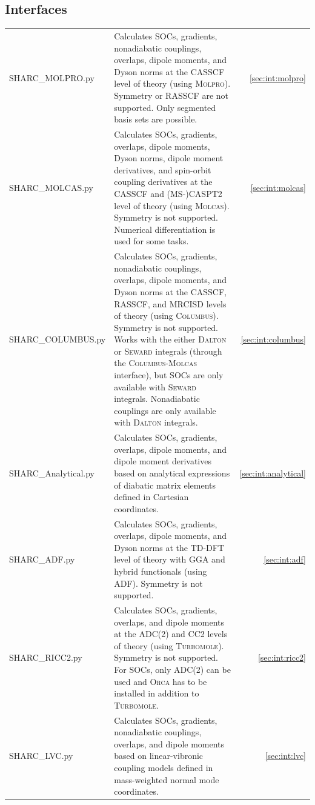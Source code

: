 \documentclass[a4paper,10pt,DIV=15,openany]{scrbook}
\begin{document}
\subsection{Interfaces}

\begin{tabular}{>{\ttfamily}lp{10.5cm}r}
  SHARC\_MOLPRO.py      &Calculates SOCs, gradients, nonadiabatic couplings, overlaps,     dipole moments, and Dyson norms at the CASSCF level of theory (using \textsc{Molpro}). Symmetry or RASSCF are not supported. Only segmented basis sets are possible.   &\ref{sec:int:molpro}\\
  SHARC\_MOLCAS.py      &Calculates SOCs, gradients,                         overlaps,     dipole moments,     Dyson norms, dipole moment derivatives, and spin-orbit coupling derivatives at the CASSCF and (MS-)CASPT2 level of theory (using \textsc{Molcas}). Symmetry is not supported. Numerical differentiation is used for some tasks.   &\ref{sec:int:molcas}\\
  SHARC\_COLUMBUS.py    &Calculates SOCs, gradients, nonadiabatic couplings, overlaps,     dipole moments, and Dyson norms at the CASSCF, RASSCF, and MRCISD levels of theory (using \textsc{Columbus}). Symmetry is not supported. Works with the either \textsc{Dalton} or \textsc{Seward} integrals (through the \textsc{Columbus}-\textsc{Molcas} interface), but SOCs are only available with \textsc{Seward} integrals. Nonadiabatic couplings are only available with \textsc{Dalton} integrals.                &\ref{sec:int:columbus}\\
  SHARC\_Analytical.py  &Calculates SOCs, gradients,                         overlaps,     dipole moments, and              dipole moment derivatives based on analytical expressions of diabatic matrix elements defined in Cartesian coordinates.       &\ref{sec:int:analytical}\\
  SHARC\_ADF.py         &Calculates SOCs, gradients,                         overlaps,     dipole moments, and Dyson norms at the TD-DFT level of theory with GGA and hybrid functionals (using \textsc{ADF}). Symmetry is not supported.  &\ref{sec:int:adf}\\
  SHARC\_RICC2.py       &Calculates SOCs, gradients,                         overlaps, and dipole moments at the ADC(2) and CC2 levels of theory (using \textsc{Turbomole}). Symmetry is not supported. For SOCs, only ADC(2) can be used and \textsc{Orca} has to be installed in addition to \textsc{Turbomole}.        &\ref{sec:int:ricc2}\\
  SHARC\_LVC.py         &Calculates SOCs, gradients, nonadiabatic couplings, overlaps, and dipole moments based on linear-vibronic coupling models defined in mass-weighted normal mode coordinates.         &\ref{sec:int:lvc}\\

\end{tabular}
\end{document}
